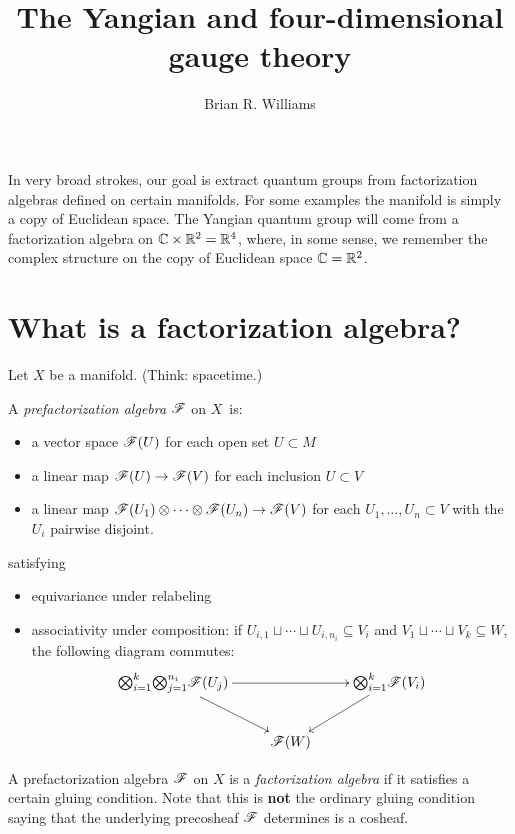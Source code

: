 \documentclass[10pt]{amsart}
\title{The Yangian and four-dimensional gauge theory}
\author{Brian R. Williams}
\date{}
\begin{document}
\maketitle

In very broad strokes, our goal is extract quantum groups from factorization algebras defined on certain manifolds.
For some examples the manifold is simply a copy of Euclidean space. 
The Yangian quantum group will come from a factorization algebra on $\mathbb C \times \mathbb R^2 = \mathbb R^4$, where, in some sense, we remember the complex structure on the copy of Euclidean space $\mathbb C = \mathbb R^2$.

\section{What is a factorization algebra?}

Let $X$ be a manifold. (Think: spacetime.)

{A {\em prefactorization algebra} $\mathscr F$ on $X$~is:}
{\small 
\begin{itemize}
\item {a vector space $\mathscr F(U)$ for each open set $U \subset M$}

\item {a linear map $\mathscr F(U) \rightarrow \mathscr F(V)$ for each inclusion $U \subset V$}

\item {a linear map $\mathscr F(U_1) \otimes \cdots \otimes \mathscr F(U_n) \rightarrow \mathscr F(V)$ for each $U_1,\ldots,U_n \subset V$ with the $U_i$ pairwise disjoint.}

\end{itemize}
}
satisfying
\begin{itemize}
\item {equivariance under relabeling} 
\item {associativity under composition: if $U_{i,1}\sqcup\cdots\sqcup U_{i,n_i}\subseteq V_i$ and $V_1\sqcup\cdots\sqcup V_k\subseteq W$, the following diagram commutes:}
\[
\xymatrix{
{\bigotimes}^{k}_{i=1}{\bigotimes}^{n_i}_{j=1}\sF(U_j) \ar[dr] \ar[rr] &   &{\bigotimes}^k_{i=1}\sF(V_i) \ar[dl]\\
&\sF(W)  &
}
\]
\end{itemize}

A prefactorization algebra $\mathscr F$ on $X$ is a {\em factorization algebra} if it satisfies a certain gluing condition.
Note that this is {\bf not} the ordinary gluing condition saying that the underlying precosheaf $\mathscr F$ determines is a cosheaf. 
\end{document}
